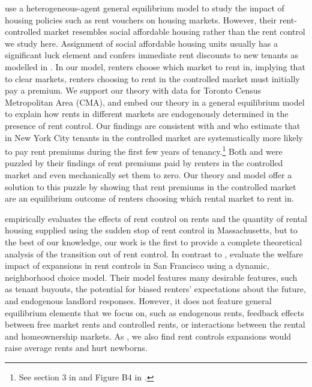 \documentclass[parskip=full]{article}
\begin{document}
\citet{fmn-2022} use a heterogeneous-agent general equilibrium model to study the impact of housing policies such as rent vouchers on housing markets. However, their rent-controlled market resembles social affordable housing rather than the rent control we study here. Assignment of social affordable housing units usually has a significant luck element and confers immediate rent discounts to new tenants as modelled in \citet{fmn-2022}. In our model, renters choose which market to rent in, implying that to clear markets, renters choosing to rent in the controlled market must initially pay a premium. We support our theory with data for Toronto Census Metropolitan Area (CMA), and embed our theory in a general equilibrium model to explain how rents in different markets are endogenously determined in the presence of rent control. Our findings are consistent with \citet{early-2000} and \citet{cjq-2023} who estimate that in New York City tenants in the controlled market are systematically more likely to pay rent premiums during the first few years of tenancy.\footnote{See section 3 in \citet{early-2000} and Figure B4 in \citet{cjq-2023}.} Both \citet{early-2000} and \citet{cjq-2023} were puzzled by their findings of rent premiums paid by renters in the controlled market and \citet{early-2000} even mechanically set them to zero. Our theory and model offer a solution to this puzzle by showing that rent premiums in the controlled market are an equilibrium outcome of renters choosing which rental market to rent in. 

\citet{sims-2007} empirically evaluates the effects of rent control on rents and the quantity of rental housing supplied using the sudden stop of rent control in Massachusetts, but to the best of our knowledge, our work is the first to provide a complete theoretical analysis of the transition out of rent control. In contrast to \citet{sims-2007}, \citet{diamond-2019} evaluate the welfare impact of expansions in rent controls in San Francisco using a dynamic, neighborhood choice model. Their model features many desirable features, such as tenant buyouts, the potential for biased renters' expectations about the future, and endogenous landlord responses. However, it does not feature general equilibrium elements that we focus on, such as endogenous rents, feedback effects between free market rents and controlled rents, or interactions between the rental and homeownership markets. As \citet{diamond-2019}, we also find rent controls expansions would raise average rents and hurt newborns.
\end{document}
